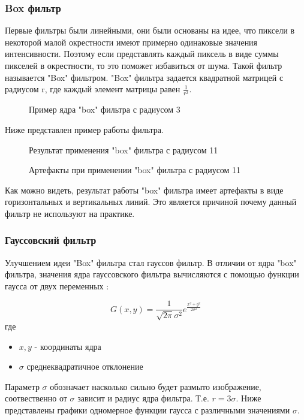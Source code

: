 \subsubsection{Box фильтр}
Первые фильтры были линейными, они были основаны на идее, что пиксели в некоторой малой окрестности имеют примерно одинаковые значения интенсивности. Поэтому если представлять каждый пиксель в виде суммы пикселей в окрестности, то это поможет избавиться от шума. Такой фильтр называется "Box" фильтром. "Box" фильтра задается квадратной матрицей с радиусом r, где каждый элемент матрицы равен $\frac{1}{r^2}$.
\begin{figure}[H]
	\label{img:kernelBox}
	\caption{Пример ядра "box" фильтра с радиусом 3}
\end{figure}
Ниже представлен пример работы фильтра.
\begin{figure}[H]
	\caption{Результат применения "box" фильтра с радиусом 11}
\end{figure}
\begin{figure}[H]
	\caption{Артефакты при применении "box" фильтра с радиусом 11}
\end{figure}
Как можно видеть, результат работы "box"  фильтра имеет артефакты в виде горизонтальных и вертикальных линий. Это является причиной почему данный фильтр не используют на практике.
\subsubsection{Гауссовский фильтр}
Улучшением идеи "Box"  фильтра стал гауссов фильтр. В отличии от ядра "box" фильтра, значения ядра гауссовского фильтра вычисляются с помощью функции гаусса от двух переменных :

\begin{equation}
	G(x,y) = \frac{1}{\sqrt{2\pi}\sigma^2}e^{\frac{x^2+y^2}{2\sigma^2}}
\end{equation}
где
\begin{itemize}
	\item $x,y$ - координаты ядра
	\item $\sigma$ среднеквадратичное отклонение
\end{itemize}

Параметр $\sigma$ обозначает насколько сильно будет размыто изображение, соотвественно от $\sigma$ зависит и радиус ядра фильтра. Т.е. $r=3\sigma$. Ниже представлены графики одномерное функции гаусса с различными значениями $\sigma$.

